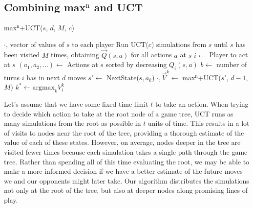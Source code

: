\documentclass[letterpaper]{article}
\numberwithin{equation}{section}
\numberwithin{theorem}{section}
\numberwithin{lemma}{section}
\numberwithin{df}{section}
\begin{document}
\subsection{Combining max$^\text{n}$ and UCT}

\begin{algorithm}[t]
	\caption{max$^\text{n}$+UCT($s$, $d$, $M$, $c$)}
	\label{alg:maxNUct}
	\begin{footnotesize}
	\begin{algorithmic}[1]
			\RETURN $\cdot$, vector of values of $s$ to each player
		\ENDIF
		\STATE Run UCT($c$) simulations from $s$ until $s$ has been visited $M$ times, obtaining $\vec{Q}(s,a)$ for all actions $a$ at $s$
		\STATE $i \gets $ Player to act at $s$
		\STATE $(a_1, a_2, ...) \gets $ Actions at $s$ sorted by decreasing $Q_i(s,a)$
		\ENDIF
		\STATE $b \gets $ number of turns $i$ has in next $d$ moves
			\STATE $s' \gets $ NextState($s, a_k$)
			\STATE $\cdot, \vec{V}^k \gets $ max$^\text{n}$+UCT($s'$, $d - 1$, $M$)
		\ENDFOR
		\STATE $k^* \gets \text{argmax}_k V_i^k$
	\end{algorithmic}
	\end{footnotesize}
\end{algorithm}

Let's assume that we have some fixed time limit $t$ to take an action.  When trying to decide which action to take at the root node of a game tree, UCT runs as many simulations from the root as possible in $t$ units of time.  This results in a lot of visits to nodes near the root of the tree, providing a thorough estimate of the value of each of these states.  However, on average, nodes deeper in the tree are visited fewer times because each simulation takes a single path through the game tree.  Rather than spending all of this time evaluating the root, we may be able to make a more informed decision if we have a better estimate of the future moves we and our opponents might later take.  Our algorithm distributes the simulations not only at the root of the tree, but also at deeper nodes along promising lines of play.

\end{document}
